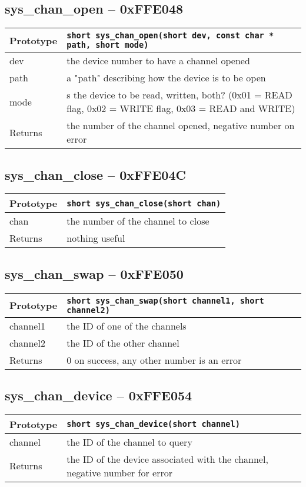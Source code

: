 \subsection*{sys\_chan\_open -- 0xFFE048}
\begin{tabular}{|l||l|} \hline
Prototype & \lstinline!short sys_chan_open(short dev, const char * path, short mode)! \\ \hline
dev & the device number to have a channel opened \\ \hline
path & a "path" describing how the device is to be open \\ \hline
mode & s the device to be read, written, both? (0x01 = READ flag, 0x02 = WRITE flag, 0x03 = READ and WRITE) \\ \hline
Returns & the number of the channel opened, negative number on error \\ \hline
\end{tabular}

\subsection*{sys\_chan\_close -- 0xFFE04C}
\begin{tabular}{|l||l|} \hline
Prototype & \lstinline!short sys_chan_close(short chan)! \\ \hline
chan & the number of the channel to close \\ \hline
Returns & nothing useful \\ \hline
\end{tabular}

\subsection*{sys\_chan\_swap -- 0xFFE050}
\begin{tabular}{|l||l|} \hline
Prototype & \lstinline!short sys_chan_swap(short channel1, short channel2)! \\ \hline
channel1 & the ID of one of the channels \\ \hline
channel2 & the ID of the other channel \\ \hline
Returns & 0 on success, any other number is an error \\ \hline
\end{tabular}

\subsection*{sys\_chan\_device -- 0xFFE054}
\begin{tabular}{|l||l|} \hline
Prototype & \lstinline!short sys_chan_device(short channel)! \\ \hline
channel & the ID of the channel to query \\ \hline
Returns & the ID of the device associated with the channel, negative number for error \\ \hline
\end{tabular}

